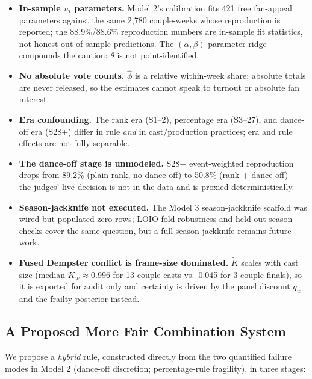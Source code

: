 \documentclass[10pt]{article}
\begin{document}
\begin{itemize}[itemsep=1pt]
\item \textbf{In-sample $u_i$ parameters.} Model 2's calibration fits 421 free fan-appeal
parameters against the same 2{,}780 couple-weeks whose reproduction is reported; the
88.9\%/88.6\% reproduction numbers are in-sample fit statistics, not honest out-of-sample
predictions. The $(\alpha, \beta)$ parameter ridge compounds the caution: $\theta$ is not
point-identified.
\item \textbf{No absolute vote counts.} $\hat\phi$ is a relative within-week share;
absolute totals are never released, so the estimates cannot speak to turnout or absolute
fan interest.
\item \textbf{Era confounding.} The rank era (S1--2), percentage era (S3--27), and
dance-off era (S28+) differ in rule \emph{and} in cast/production practices; era and rule
effects are not fully separable.
\item \textbf{The dance-off stage is unmodeled.} S28+ event-weighted reproduction drops
from 89.2\% (plain rank, no dance-off) to 50.8\% (rank + dance-off) --- the judges' live
decision is not in the data and is proxied deterministically.
\item \textbf{Season-jackknife not executed.} The Model 3 season-jackknife scaffold was
wired but populated zero rows; LOIO fold-robustness and held-out-season checks cover the
same question, but a full season-jackknife remains future work.
\item \textbf{Fused Dempster conflict is frame-size dominated.} $\widetilde K$ scales with
cast size (median $K_w \approx 0.996$ for 13-couple casts vs.\ 0.045 for 3-couple finals),
so it is exported for audit only and certainty is driven by the panel discount $q_w$ and
the frailty posterior instead.
\end{itemize}

\subsection{A Proposed More Fair Combination System}
\label{sec:proposed}

We propose a \emph{hybrid} rule, constructed directly from the two quantified failure
modes in Model 2 (dance-off discretion; percentage-rule fragility), in three stages:
\end{document}
